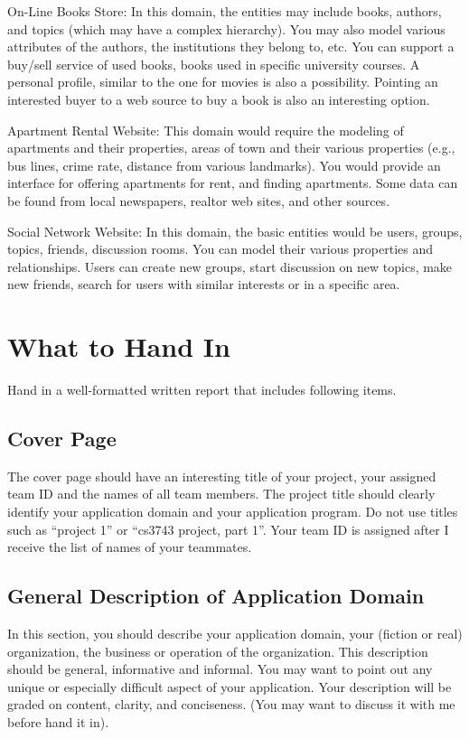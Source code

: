 \documentclass[11pt]{article}
\begin{document}
  On-Line Books Store: In this domain, the entities may include books,
  authors, and topics (which may have a complex hierarchy). You may also
  model various attributes of the authors, the institutions they belong
  to, etc. You can support a buy/sell service of used books, books used
  in specific university courses. A personal profile, similar to the one
  for movies is also a possibility. Pointing an interested buyer to a
  web source to buy a book is also an interesting option.

  Apartment Rental Website: This domain would require the modeling of
  apartments and their properties, areas of town and their various
  properties (e.g., bus lines, crime rate, distance from various
  landmarks). You would provide an interface for offering apartments for
  rent, and finding apartments. Some data can be found from local
  newspapers, realtor web sites, and other sources.

  Social Network Website: In this domain, the basic entities would be
  users, groups, topics, friends, discussion rooms. You can model their
  various properties and relationships. Users can create new groups,
  start discussion on new topics, make new friends, search for users
  with similar interests or in a specific area.
\section*{What to Hand In}
\label{sec-4}


  Hand in a well-formatted written report that includes following items.
\subsection*{Cover Page}
\label{sec-4-1}


   The cover page should have an interesting title of your project, your
   assigned team ID and the names of all team members. The project title
   should clearly identify your application domain and your application
   program. Do not use titles such as ``project 1'' or ``cs3743 project,
   part 1''. Your team ID is assigned after I receive the list of names of
   your teammates.
\subsection*{General Description of Application Domain}
\label{sec-4-2}


   In this section, you should describe your application domain, your
   (fiction or real) organization, the business or operation of the
   organization. This description should be general, informative and
   informal. You may want to point out any unique or especially difficult
   aspect of your application. Your description will be graded on
   content, clarity, and conciseness. (You may want to discuss it with me
   before hand it in).
\end{document}
